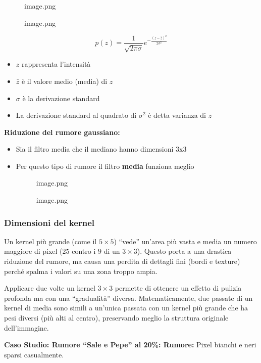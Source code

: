 \documentclass[
]{article}
\providecommand{\tightlist}{%
  \setlength{\itemsep}{0pt}\setlength{\parskip}{0pt}}
\begin{document}
\begin{figure}
\centering
{image.png}
\caption{image.png}
\end{figure}

\[
p(z) = \frac{1}{\sqrt{2\pi \sigma}} e^{-\frac{(z - \bar{z})^2}{2\sigma^2}}
\]

\begin{itemize}
\tightlist
\item
  \(z\) rappresenta l'intensità
\item
  \(\bar{z}\) è il valore medio (media) di \(z\)
\item
  \(\sigma\) è la derivazione standard
\item
  La derivazione standard al quadrato di \(\sigma^2\) è detta varianza di \(z\)
\end{itemize}

\textbf{Riduzione del rumore gaussiano:}

\begin{itemize}
\item
  Sia il filtro media che il mediano hanno dimensioni 3x3
\item
  Per questo tipo di rumore il filtro \textbf{media} funziona meglio

  \begin{figure}
  \centering
  {image.png}
  \caption{image.png}
  \end{figure}
\end{itemize}

\hypertarget{dimensioni-del-kernel}{%
\subsubsection{Dimensioni del kernel}\label{dimensioni-del-kernel}}

Un kernel più grande (come il \(5 \times 5\)) ``vede'' un'area più vasta e media un numero maggiore di pixel (\(25\) contro i \(9\) di un \(3 \times 3\)). Questo porta a una drastica riduzione del rumore, ma causa una perdita di dettagli fini (bordi e texture) perché spalma i valori su una zona troppo ampia.

Applicare due volte un kernel \(3 \times 3\) permette di ottenere un effetto di pulizia profonda ma con una ``gradualità'' diversa. Matematicamente, due passate di un kernel di media sono simili a un'unica passata con un kernel più grande che ha pesi diversi (più alti al centro), preservando meglio la struttura originale dell'immagine.

\textbf{Caso Studio: Rumore ``Sale e Pepe'' al 20\%:
Rumore:} Pixel bianchi e neri sparsi casualmente.
\end{document}

